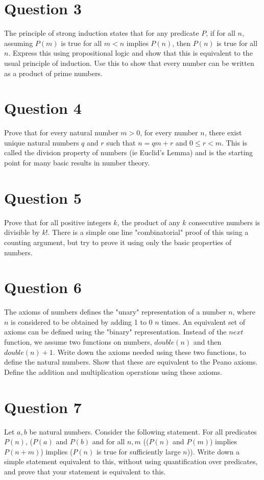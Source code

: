 \documentclass[12pt]{report}
\begin{document}
\section*{Question 3}
The principle of strong induction states that for any predicate $P$, if for all $n$, assuming $P(m)$ is true for all $m < n$ implies $P(n)$, then $P(n)$ is true for all $n$. Express this using propositional logic and show that this is equivalent to the usual principle of induction. Use this to show that every number can be written as a product of prime numbers.

\section*{Question 4}
Prove that for every natural number $m > 0$, for every number $n$, there exist unique natural numbers $q$ and $r$ such that $n = qm + r$ and $0 \leq r < m$. This
is called the division property of numbers (ie Euclid's Lemma) and is the starting point for many basic results in number theory.
\section*{Question 5}
Prove that for all positive integers $k$, the product of any $k$ consecutive numbers is divisible by $k!$. There is a simple one line "combinatorial" proof of this using a counting argument, but try to prove it using only the basic properties of numbers.
\section*{Question 6}
The axioms of numbers defines the "unary" representation of a number $n$, where $n$ is considered to be obtained by adding 1 to 0 $n$ times.  An equivalent set of axioms can be defined using the "binary" representation. Instead of the $next$ function, we assume two functions on numbers, $double(n)$ and then $double(n) + 1$. Write down the axioms needed using these two functions, to define the natural numbers. Show that these are equivalent to the Peano
axioms. Define the addition and multiplication operations using these axioms.
\section*{Question 7}
Let $a, b$ be natural numbers. Consider the following statement. For all predicates $P(n)$, ($P(a)$ and $P(b)$ and for all $n, m$ (($P(n)$ and $P(m)$) implies $P(n + m)$) implies ($P(n)$ is true for sufficiently large $n$)).  Write down a simple statement equivalent to this, without using quantification over predicates, and prove that your statement is equivalent to this.
\end{document}
